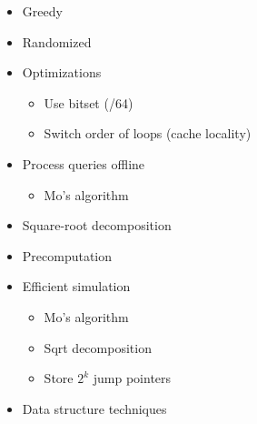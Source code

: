 \documentclass[11.5pt,a4paper,landscape,oneside]{amsart}
\newenvironment{myitemize}
{ \begin{itemize}[leftmargin=.5cm]
    \setlength{\itemsep}{0pt}
    \setlength{\parskip}{0pt}
    \setlength{\parsep}{0pt}     }
{ \end{itemize}                  }
\begin{document}
\begin{multicols*}{2}
\begin{myitemize}
\begin{itemize}
\begin{itemize}
                                \item Knuth optimization
                                    \begin{itemize}
                                        \item $\mathrm{dp}[i][j] = \min_{i<k<j}\{\mathrm{dp}[i][k] + \mathrm{dp}[k][j] + C[i][j]\}$
                                        \item $A[i][j-1] \leq A[i][j] \leq A[i+1][j]$
                                        \item $O(n^3)$ to $O(n^2)$
                                        \item sufficient: QI and $C[b][c] \leq C[a][d]$, $a\leq b\leq c\leq d$
                                    \end{itemize}
                            \end{itemize}
                    \end{itemize}
                \item Greedy
                \item Randomized
                \item Optimizations
                    \begin{itemize}
                        \item Use bitset (/64)
                        \item Switch order of loops (cache locality)
                    \end{itemize}
                \item Process queries offline
                    \begin{itemize}
                        \item Mo's algorithm
                    \end{itemize}
                \item Square-root decomposition
                \item Precomputation
                \item Efficient simulation
                    \begin{itemize}
                        \item Mo's algorithm
                        \item Sqrt decomposition
                        \item Store $2^k$ jump pointers
                    \end{itemize}
                \item Data structure techniques

\end{myitemize}
\end{multicols*}
\end{document}
